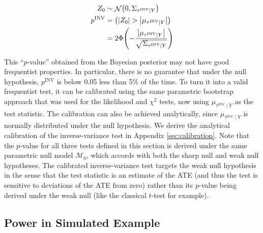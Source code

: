 \documentclass[letter]{article}
\DeclarePairedDelimiter{\parenthesis}{\lparen}{\rparen}
\DeclarePairedDelimiter{\absolutevalue}{\lvert}{\rvert}
\newcommand{\del}[1]{\parenthesis*{#1}}
\newcommand{\abs}[1]{\absolutevalue*{#1}}
\let\Pr\relax
\DeclareMathOperator{\Pr}{\mathbb{P}}
\DeclareMathOperator{\normal}{\mathcal{N}}
\newcommand{\invvar}{\tau^{\mathrm{INV}}}
\newcommand{\modnull}{\mathscr{M}_0}
\begin{document}
\begin{equation}
\begin{split}
    Z_0 &\sim \normal\del{0, \Sigma_{\invvar \mid Y}}  \\
    p^{\mathrm{INV}} &= \Pr\del{ 
        \abs{Z_0} > 
        \abs{
            \mu_{
                \invvar \mid Y
            }
        } 
    } \\
    &= 2\Phi\del{-
        \frac{
            \abs{
                \mu_{
                    \invvar \mid Y
                }
            }
        }{
            \sqrt{
                \Sigma_{\invvar \mid Y}
            }
        }
    }
\end{split}
\end{equation}

This ``\(p\)-value'' obtained from the Bayesian posterior may not have good frequentist properties.
In particular, there is no guarantee that under the null hypothesis, \(p^{\mathrm{INV}}\) is below 0.05 less than 5\% of the time.
To turn it into a valid frequentist test, it can be calibrated using the same parametric bootstrap approach that was used for the likelihood and \(\chi^2\) tests, now using \(\mu_{\invvar \mid Y}\) as the test statistic.
The calibration can also be achieved analytically, since \(\mu_{\invvar \mid Y}\) is normally distributed under the null hypothesis.
We derive the analytical calibration of the inverse-variance test in Appendix \ref{sec:calibration}.
Note that the \(p\)-value for all three tests defined in this section is derived under the same parametric null model \(\modnull\), which accords with both the sharp null and weak null hypotheses.
The calibrated inverse-variance test targets the weak null hypothesis in the sense that the test statistic is an estimate of the ATE (and thus the test is sensitive to deviations of the ATE from zero) rather than its \(p\)-value being derived under the weak null (like the classical \(t\)-test for example).

\label{eq:calib_test}
    


    	\subsection{Power in Simulated Example}\label{power-in-simulated-example}

\label{sec:powersim}
    
\end{document}
